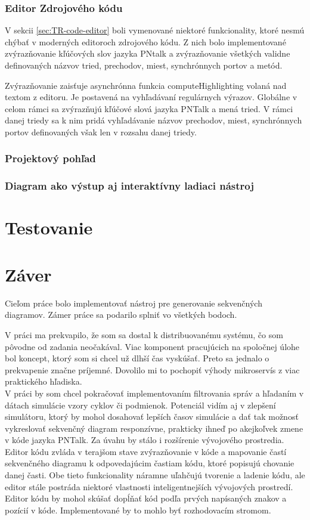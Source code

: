 \subsection{Editor Zdrojového kódu}

V sekcii \ref{sec:TR-code-editor} boli vymenované niektoré funkcionality, ktoré nesmú chýbať v moderných editoroch zdrojového kódu. Z nich bolo implementované zvýrazňovanie kľúčových slov jazyka PNtalk a zvýrazňovanie všetkých validne definovaných názvov tried, prechodov, miest, synchrónnych portov a metód.

Zvýrazňovanie zaisťuje asynchrónna funkcia computeHighlighting volaná nad textom z editoru. Je postavená na vyhľadávaní regulárnych výrazov. Globálne v celom rámci sa zvýrazňujú kľúčové slová jazyka PNTalk a mená tried. V rámci danej triedy sa k nim pridá vyhľadávanie názvov prechodov, miest, synchrónnych portov definovaných však len v rozsahu danej triedy.

\subsection{Projektový pohľad}

\subsection{Diagram ako výstup aj interaktívny ladiaci nástroj}

\chapter{Testovanie}

\chapter{Záver}

Cieľom práce bolo implementovať nástroj pre generovanie sekvenčných diagramov. Zámer práce sa podarilo splniť vo všetkých bodoch.

V práci ma prekvapilo, že som sa dostal k distribuovanému systému, čo som pôvodne od zadania neočakával. Viac komponent pracujúcich na spoločnej úlohe bol koncept, ktorý som si chcel už dlhší čas vyskúšať. Preto sa jednalo o prekvapenie značne príjemné. Dovolilo mi to pochopiť výhody mikroservís z viac praktického hľadiska. \\

V práci by som chcel pokračovať implementovaním filtrovania správ a hľadaním v dátach simulácie vzory cyklov či podmienok. Potenciál vidím aj v zlepšení simulátoru, ktorý by mohol dosahovať lepších časov simulácie a dať tak možnosť vykreslovať sekvenčný diagram responzívne, prakticky ihneď po akejkoľvek zmene v kóde jazyka PNTalk. Za úvahu by stálo i rozšírenie vývojového prostredia.
Editor kódu zvláda v terajšom stave zvýrazňovanie v kóde a mapovanie častí sekvenčného diagramu k odpovedajúcim častiam kódu, ktoré popisujú chovanie danej časti. Obe tieto funkcionality náramne uľahčujú tvorenie a ladenie kódu, ale editor stále postráda niektoré vlastnosti inteligentnejších vývojových prostredí. Editor kódu by mohol skúšať dopĺňať kód podľa prvých napísaných znakov a pozícií v kóde. Implementované by to mohlo byť rozhodovacím stromom. 

